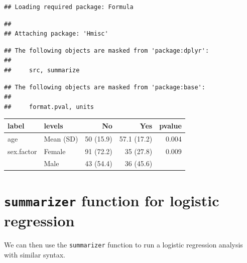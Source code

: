 \documentclass[]{book}
\makeatletter
\newenvironment{Shaded}{\begin{snugshade}}{\end{snugshade}}
\newcommand{\KeywordTok}[1]{\textcolor[rgb]{0.13,0.29,0.53}{\textbf{#1}}}
\newcommand{\DataTypeTok}[1]{\textcolor[rgb]{0.13,0.29,0.53}{#1}}
\newcommand{\StringTok}[1]{\textcolor[rgb]{0.31,0.60,0.02}{#1}}
\newcommand{\OtherTok}[1]{\textcolor[rgb]{0.56,0.35,0.01}{#1}}
\newcommand{\OperatorTok}[1]{\textcolor[rgb]{0.81,0.36,0.00}{\textbf{#1}}}
\newcommand{\NormalTok}[1]{#1}
\newenvironment{kframe}{%
\medskip{}
\setlength{\fboxsep}{.8em}
 \def\at@end@of@kframe{}%
 \ifinner\ifhmode%
  \def\at@end@of@kframe{\end{minipage}}%
  \begin{minipage}{\columnwidth}%
 \fi\fi%
 \def\FrameCommand##1{\hskip\@totalleftmargin \hskip-\fboxsep
 \colorbox{shadecolor}{##1}\hskip-\fboxsep
     \hskip-\linewidth \hskip-\@totalleftmargin \hskip\columnwidth}%
 \MakeFramed {\advance\hsize-\width
   \@totalleftmargin\z@ \linewidth\hsize
   \@setminipage}}%
 {\par\unskip\endMakeFramed%
 \at@end@of@kframe}
\renewenvironment{Shaded}{\begin{kframe}}{\end{kframe}}
\makeatother
\begin{document}
\begin{verbatim}
## Loading required package: Formula
\end{verbatim}

\begin{verbatim}
## 
## Attaching package: 'Hmisc'
\end{verbatim}

\begin{verbatim}
## The following objects are masked from 'package:dplyr':
## 
##     src, summarize
\end{verbatim}

\begin{verbatim}
## The following objects are masked from 'package:base':
## 
##     format.pval, units
\end{verbatim}

\begin{Shaded}
\end{Shaded}

\begin{tabular}{l|l|r|r|r}
\hline
label & levels & No & Yes & pvalue\\
\hline
age & Mean (SD) & 50 (15.9) & 57.1 (17.2) & 0.004\\
\hline
sex.factor & Female & 91 (72.2) & 35 (27.8) & 0.009\\
\hline
 & Male & 43 (54.4) & 36 (45.6) & \\
\hline
\end{tabular}

\section{\texorpdfstring{\texttt{summarizer} function for logistic
regression}{summarizer function for logistic regression}}\label{summarizer-function-for-logistic-regression}

We can then use the \texttt{summarizer} function to run a logistic
regression analysis with similar syntax.
\end{document}
